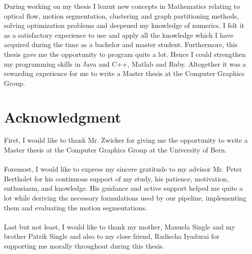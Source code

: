 During working on my thesis I learnt new concepts in Mathematics relating to optical flow, motion segmentation, clustering and graph partitioning methods, solving optimization problems and deepened my knowledge of numerics. I felt it as a satisfactory experience to use and apply all the knowledge which I have acquired during the time as a bachelor and master student. Furthermore, this thesis gave me the opportunity to program quite a lot. Hence I could strengthen my programming skills in Java and C++, Matlab and Ruby. Altogether it was a rewarding experience for me to write a Master thesis at the Computer Graphics Group.
\section{Acknowledgment}
First, I would like to thank Mr. Zwicker for giving me the opportunity to write a Master thesis at the Computer Graphics Group at the University of Bern. \\ \\
Foremost, I would like to express my sincere gratitude to my advisor Mr. Peter Bertholet for his continuous support of my study, his patience, motivation, enthusiasm, and knowledge. His guidance and active support helped me quite a lot while deriving the necessary formulations used by our pipeline, implementing them and evaluating the motion segmentations. \\ \\
Last but not least, I would like to thank my mother, Manuela Single and my brother Patrik Single and also to my close friend, Radischa Iyadurai for supporting me morally throughout during this thesis.